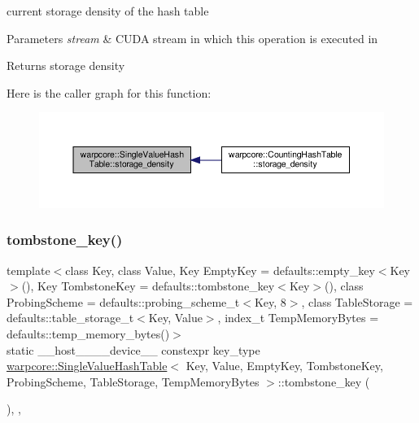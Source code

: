 current storage density of the hash table 


\begin{DoxyParams}{Parameters}
{\em stream} & C\+U\+DA stream in which this operation is executed in \\
\hline
\end{DoxyParams}
\begin{DoxyReturn}{Returns}
storage density 
\end{DoxyReturn}
Here is the caller graph for this function\+:
\nopagebreak
\begin{figure}[H]
\begin{center}
\leavevmode
\includegraphics[width=350pt]{classwarpcore_1_1SingleValueHashTable_a9383092375777d800f145b7f2369832d_icgraph}
\end{center}
\end{figure}
\mbox{\label{classwarpcore_1_1SingleValueHashTable_afd4fb9761ef0fd1a497a9cff5f5bd52e}} 
\subsubsection{\texorpdfstring{tombstone\+\_\+key()}{tombstone\_key()}}
{\footnotesize\ttfamily template$<$class Key, class Value, Key Empty\+Key = defaults\+::empty\+\_\+key$<$\+Key$>$(), Key Tombstone\+Key = defaults\+::tombstone\+\_\+key$<$\+Key$>$(), class Probing\+Scheme = defaults\+::probing\+\_\+scheme\+\_\+t$<$\+Key, 8$>$, class Table\+Storage = defaults\+::table\+\_\+storage\+\_\+t$<$\+Key, Value$>$, index\+\_\+t Temp\+Memory\+Bytes = defaults\+::temp\+\_\+memory\+\_\+bytes()$>$ \\
static \+\_\+\+\_\+host\+\_\+\+\_\+\+\_\+\+\_\+device\+\_\+\+\_\+ constexpr key\+\_\+type \hyperlink{classwarpcore_1_1SingleValueHashTable}{warpcore\+::\+Single\+Value\+Hash\+Table}$<$ Key, Value, Empty\+Key, Tombstone\+Key, Probing\+Scheme, Table\+Storage, Temp\+Memory\+Bytes $>$\+::tombstone\+\_\+key (\begin{DoxyParamCaption}{ }\end{DoxyParamCaption})\hspace{0.3cm}{\ttfamily [inline]}, {\ttfamily [static]}, {\ttfamily [noexcept]}}




